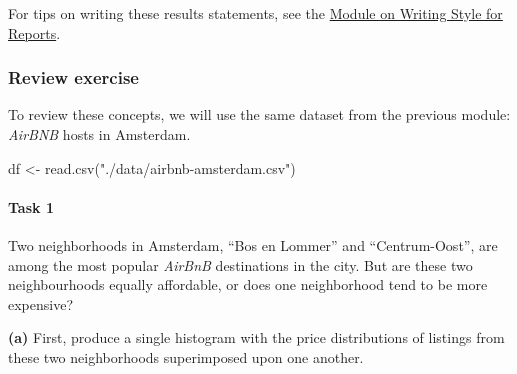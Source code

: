 \documentclass[
]{book}
\newenvironment{Shaded}{\begin{snugshade}}{\end{snugshade}}
\newcommand{\FunctionTok}[1]{\textcolor[rgb]{0.00,0.00,0.00}{#1}}
\newcommand{\NormalTok}[1]{#1}
\newcommand{\OtherTok}[1]{\textcolor[rgb]{0.56,0.35,0.01}{#1}}
\newcommand{\StringTok}[1]{\textcolor[rgb]{0.31,0.60,0.02}{#1}}
\begin{document}
For tips on writing these results statements, see the \protect\hyperlink{style}{Module on Writing Style for Reports}.

\hypertarget{review-exercise-3}{%
\subsubsection*{Review exercise}\label{review-exercise-3}}

To review these concepts, we will use the same dataset from the previous module: \emph{AirBNB} hosts in Amsterdam.

\begin{Shaded}
\begin{Highlighting}[]
\NormalTok{df }\OtherTok{\textless{}{-}} \FunctionTok{read.csv}\NormalTok{(}\StringTok{"./data/airbnb{-}amsterdam.csv"}\NormalTok{)}
\end{Highlighting}
\end{Shaded}

\hypertarget{task-1-1}{%
\paragraph*{Task 1}\label{task-1-1}}

Two neighborhoods in Amsterdam, ``Bos en Lommer'' and ``Centrum-Oost'', are among the most popular \emph{AirBnB} destinations in the city. But are these two neighbourhoods equally affordable, or does one neighborhood tend to be more expensive?

\textbf{(a)} First, produce a single histogram with the price distributions of listings from these two neighborhoods superimposed upon one another.
\end{document}
